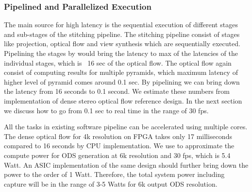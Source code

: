 \subsubsection{Pipelined and Parallelized Execution}
The main source for high latency is the sequential execution of different stages and sub-stages of the stitching pipeline. The stitching pipeline consist of stages like projection, optical flow and view synthesis which are sequentially executed. Pipelining the stages by would bring the latency to max of the latencies of the individual stages, which is ~16 sec of the optical flow. The optical flow again consist of computing results for multiple pyramids, which maximum latency of higher level of pyramid comes around 0.1 sec. By pipelining we can bring down the latency from 16 seconds to 0.1 second. We estimate these numbers from \cite{denseOFlowXilinx} implementation of dense stereo optical flow reference design. In the next section we discuss how to go from 0.1 sec to real time in the range of 30 fps. 

All the tasks in existing software pipeline can be accelerated using multiple cores. The dense optical flow for 4k resolution on FPGA takes only 17 milliseconds compared to 16 seconds by CPU implementation. We use \cite{4k60fpsZynqFPGA} to approximate the compute power for ODS generation at 6k resolution and 30 fps, which is 5.4 Watt. An ASIC implementation of the same design should further bring down the power to the order of 1 Watt. Therefore, the total system power including capture will be in the range of 3-5 Watts for 6k output ODS resolution.

